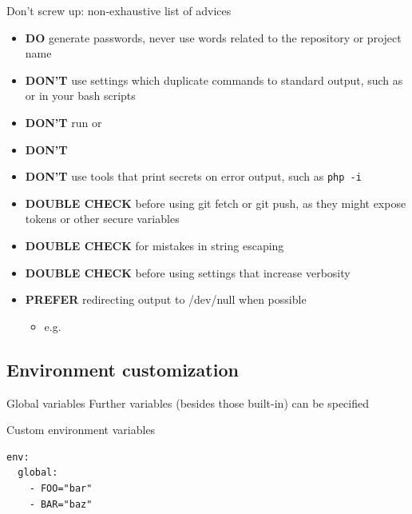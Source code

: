 \documentclass[presentation]{beamer}
\begin{document}
\begin{frame}{Don't screw up: non-exhaustive list of advices}
    \begin{itemize}
        \item \textbf{DO} generate passwords, never use words related to the repository or project name
        \item \textbf{DON'T} use settings which duplicate commands to standard output, such as  or  in your bash scripts
        \item \textbf{DON'T} run  or 
        \item \textbf{DON'T} 
        \item \textbf{DON'T} use tools that print secrets on error output, such as \texttt{php -i}
        \item \textbf{DOUBLE CHECK} before using git fetch or git push, as they might expose tokens or other secure variables
        \item \textbf{DOUBLE CHECK} for mistakes in string escaping
        \item \textbf{DOUBLE CHECK} before using settings that increase verbosity
        \item \textbf{PREFER} redirecting output to /dev/null when possible
        \begin{itemize}
            \item e.g. 
        \end{itemize}
    \end{itemize}
\end{frame}

\subsection{Environment customization}

\begin{frame}[fragile]{Global variables}
    Further variables (besides those built-in) can be specified
    \begin{block}{Custom environment variables}
         \begin{verbatim}
env:
  global:
    - FOO="bar"
    - BAR="baz"
        \end{verbatim}
    \end{block}
\end{frame}
\end{document}
